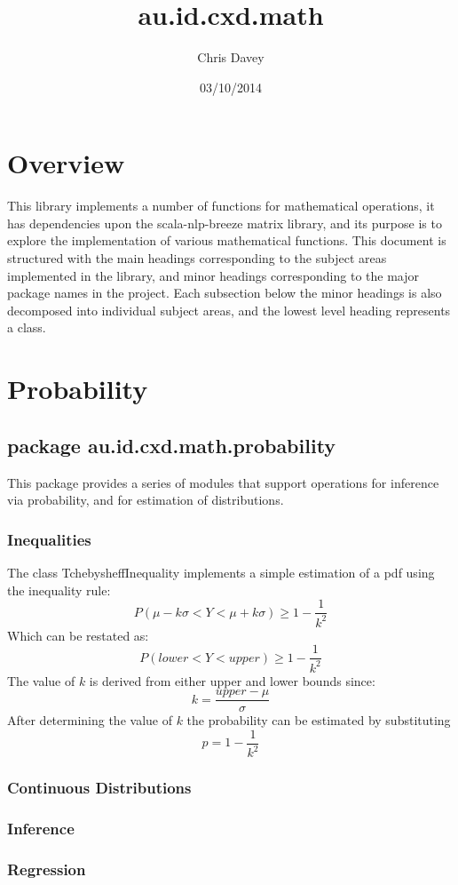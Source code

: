 \documentclass[a4paper]{article}
\title{au.id.cxd.math}
\date{03/10/2014}
\author{Chris Davey}
\begin{document}
\section{Overview}

This library implements a number of functions for mathematical operations, it has dependencies upon the scala-nlp-breeze matrix library, and its purpose is to explore the implementation of various mathematical functions.
This document is structured with the main headings corresponding to the subject areas implemented in the library, and minor headings corresponding to the major package names in the project. Each subsection below the minor headings is also decomposed into individual subject areas, and the lowest level heading represents a class.




\section{Probability}

\subsection{package au.id.cxd.math.probability}

This package provides a series of modules that support operations for inference via probability, and for estimation of distributions.

\subsubsection{Inequalities}

The class TchebysheffInequality implements a simple estimation of a pdf using the inequality rule:\\
$$
P(\mu - k\sigma < Y < \mu + k\sigma) \ge 1 - \frac{1}{k^2}
$$
Which can be restated as:
$$
P(lower < Y < upper) \ge 1 - \frac{1}{k^2}
$$
The value of $k$ is derived from either upper and lower bounds since:
$$
k = \frac{upper - \mu} {\sigma}
$$
After determining the value of $k$ the probability can be estimated by substituting
$$
p = 1 - \frac{1}{k^2}
$$





\subsubsection{Continuous Distributions}

\subsubsection{Inference}

\subsubsection{Regression}
\end{document}
